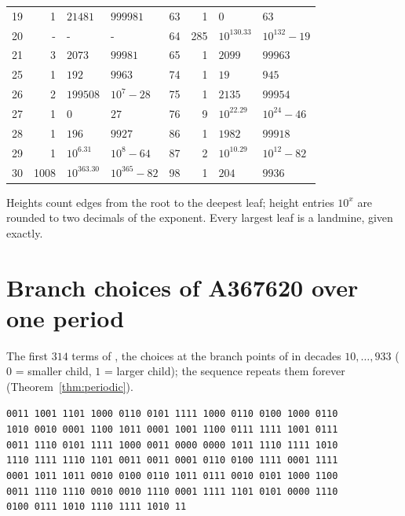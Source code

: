 \begin{center}
\begin{tabular}{@{}rrll@{\qquad}rrll@{}}
      19 &      1 & $21481$       & $999981$        &   63 &      1 & $0$           & $63$            \\
      20 &      - & -             & -               &   64 &    285 & $10^{130.33}$ & $10^{132} - 19$ \\
      21 &      3 & $2073$        & $99981$         &   65 &      1 & $2099$        & $99963$         \\
      25 &      1 & $192$         & $9963$          &   74 &      1 & $19$          & $945$           \\
      26 &      2 & $199508$      & $10^{7} - 28$   &   75 &      1 & $2135$        & $99954$         \\
      27 &      1 & $0$           & $27$            &   76 &      9 & $10^{22.29}$  & $10^{24} - 46$  \\
      28 &      1 & $196$         & $9927$          &   86 &      1 & $1982$        & $99918$         \\
      29 &      1 & $10^{6.31}$   & $10^{8} - 64$   &   87 &      2 & $10^{10.29}$  & $10^{12} - 82$  \\
      30 &   1008 & $10^{363.30}$ & $10^{365} - 82$ &   98 &      1 & $204$         & $9936$          \\
    \bottomrule
  \end{tabular}
\end{center}
Heights count edges from the root to the deepest leaf; height entries $10^{x}$ are rounded to two
decimals of the exponent. Every largest leaf is a landmine, given exactly.

\section{Branch choices of A367620 over one period}
\label{app:choices}

The first $314$ terms of , the choices at the branch points of  in
decades $10, \dots, 933$ ($0$ = smaller child, $1$ = larger child); the sequence repeats them forever
(Theorem~\ref{thm:periodic}).
\begin{center}
  \small
  \texttt{0011 1001 1101 1000 0110 0101 1111 1000 0110 0100 1000 0110}\\
  \texttt{1010 0010 0001 1100 1011 0001 1001 1100 0111 1111 1001 0111}\\
  \texttt{0011 1110 0101 1111 1000 0011 0000 0000 1011 1110 1111 1010}\\
  \texttt{1110 1111 1110 1101 0011 0011 0001 0110 0100 1111 0001 1111}\\
  \texttt{0001 1011 1011 0010 0100 0110 1011 0111 0010 0101 1000 1100}\\
  \texttt{0011 1110 1110 0010 0010 1110 0001 1111 1101 0101 0000 1110}\\
  \texttt{0100 0111 1010 1110 1111 1010 11\phantom{xx xxxx xxxx xxxx xxxx xxxx}}
\end{center}
